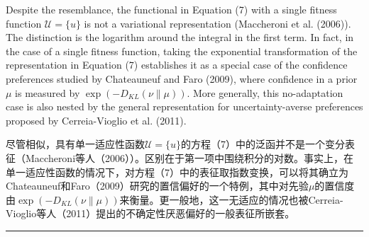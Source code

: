 \documentclass[12pt,a4paper]{article}
\newenvironment{original}
  {\par\noindent\color{black}\smallskip}
  {\par\smallskip}
\newenvironment{translation}
  {\par\noindent\color{blue!70!black}\smallskip}
  {\par\medskip\hrule\medskip}
\begin{document}
\begin{original}
Despite the resemblance, the functional in Equation (7) with a single fitness function $\mathcal{U} = \{u\}$ is not a variational representation (Maccheroni et al. (2006)). The distinction is the logarithm around the integral in the first term. In fact, in the case of a single fitness function, taking the exponential transformation of the representation in Equation (7) establishes it as a special case of the confidence preferences studied by Chateauneuf and Faro (2009), where confidence in a prior $\mu$ is measured by $\exp(-D_{KL}(\nu\|\mu))$. More generally, this no-adaptation case is also nested by the general representation for uncertainty-averse preferences proposed by Cerreia-Vioglio et al. (2011).
\end{original}
\begin{translation}
尽管相似，具有单一适应性函数$\mathcal{U} = \{u\}$的方程（7）中的泛函并不是一个变分表征（Maccheroni等人（2006））。区别在于第一项中围绕积分的对数。事实上，在单一适应性函数的情况下，对方程（7）中的表征取指数变换，可以将其确立为Chateauneuf和Faro（2009）研究的置信偏好的一个特例，其中对先验$\mu$的置信度由$\exp(-D_{KL}(\nu\|\mu))$来衡量。更一般地，这一无适应的情况也被Cerreia-Vioglio等人（2011）提出的不确定性厌恶偏好的一般表征所嵌套。
\end{translation}
\end{document}
